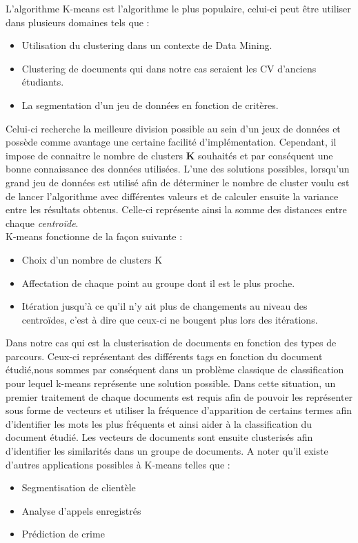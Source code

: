 \documentclass[memoire.tex]{subfiles}
\begin{document}
L'algorithme K-means est l'algorithme le plus populaire, celui-ci peut être utiliser dans plusieurs domaines tels que : 
\begin{itemize}
\item Utilisation du clustering dans un contexte de Data Mining.
\item Clustering de documents qui dans notre cas seraient les CV d'anciens étudiants.
\item La segmentation d'un jeu de données en fonction de critères.
\end{itemize}
Celui-ci recherche la meilleure division possible au sein d'un jeux de données \cite{ref5} et possède comme avantage une certaine facilité d'implémentation. Cependant, il impose de connaitre le nombre de clusters \textbf{K} souhaités et par conséquent une bonne connaissance des données utilisées. L'une des solutions possibles, lorsqu'un grand jeu de données est utilisé afin de déterminer le nombre de cluster voulu est de lancer l'algorithme avec différentes valeurs et de calculer ensuite la variance entre les résultats obtenus. Celle-ci représente ainsi la somme des distances entre chaque \textit{centroïde}.\\
K-means fonctionne de la façon suivante : 
\begin{itemize}
\item Choix d'un nombre de clusters K
\item Affectation de chaque point au groupe dont il est le plus proche.
\item Itération jusqu'à ce qu'il n'y ait plus de changements au niveau des centroïdes, c'est à dire que ceux-ci ne bougent plus lors des itérations.
\end{itemize}
Dans notre cas qui est la clusterisation de documents en fonction des types de parcours. Ceux-ci représentant des différents tags en fonction du document étudié,nous sommes par conséquent dans un problème classique de classification pour lequel k-means représente une solution possible. Dans cette situation, un premier traitement de chaque documents est requis afin de pouvoir les représenter sous forme de vecteurs et utiliser la fréquence d'apparition de certains termes afin d'identifier les mots les plus fréquents et ainsi aider à la classification du document étudié. Les vecteurs de documents sont ensuite clusterisés afin d'identifier les similarités dans un groupe de documents. A noter qu'il existe d'autres applications possibles à K-means telles que : \begin{itemize}
\item Segmentisation de clientèle
\item Analyse d'appels enregistrés
\item Prédiction de crime \cite{ref15}
\end{itemize}
\end{document}
